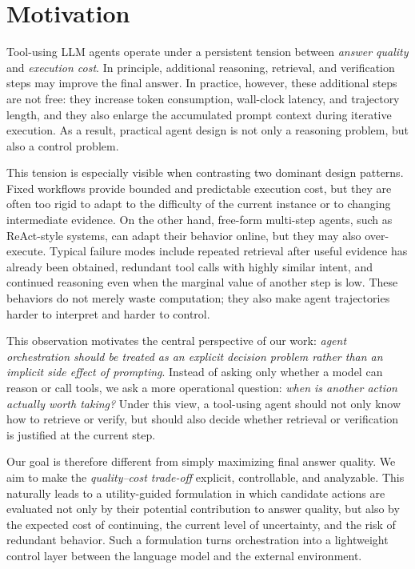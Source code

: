 \section{Motivation}

Tool-using LLM agents operate under a persistent tension between \emph{answer quality} and \emph{execution cost}. In principle, additional reasoning, retrieval, and verification steps may improve the final answer. In practice, however, these additional steps are not free: they increase token consumption, wall-clock latency, and trajectory length, and they also enlarge the accumulated prompt context during iterative execution. As a result, practical agent design is not only a reasoning problem, but also a control problem.

This tension is especially visible when contrasting two dominant design patterns. Fixed workflows provide bounded and predictable execution cost, but they are often too rigid to adapt to the difficulty of the current instance or to changing intermediate evidence. On the other hand, free-form multi-step agents, such as ReAct-style systems, can adapt their behavior online, but they may also over-execute. Typical failure modes include repeated retrieval after useful evidence has already been obtained, redundant tool calls with highly similar intent, and continued reasoning even when the marginal value of another step is low. These behaviors do not merely waste computation; they also make agent trajectories harder to interpret and harder to control.

This observation motivates the central perspective of our work: \emph{agent orchestration should be treated as an explicit decision problem rather than an implicit side effect of prompting}. Instead of asking only whether a model can reason or call tools, we ask a more operational question: \emph{when is another action actually worth taking?} Under this view, a tool-using agent should not only know how to retrieve or verify, but should also decide whether retrieval or verification is justified at the current step.

Our goal is therefore different from simply maximizing final answer quality. We aim to make the \emph{quality--cost trade-off} explicit, controllable, and analyzable. This naturally leads to a utility-guided formulation in which candidate actions are evaluated not only by their potential contribution to answer quality, but also by the expected cost of continuing, the current level of uncertainty, and the risk of redundant behavior. Such a formulation turns orchestration into a lightweight control layer between the language model and the external environment.


